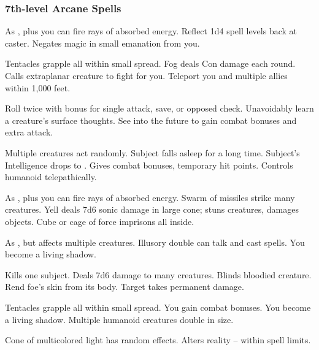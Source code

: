 \subsubsection{7th-level Arcane Spells}
\begin{swspelllist}
     As , plus you can fire rays of absorbed energy.
     Reflect 1d4 spell levels back at caster.
     Negates magic in small emanation from you.

     Tentacles grapple all within small spread.
     Fog deals Con damage each round.
     Calls extraplanar creature to fight for you.
     Teleport you and multiple allies within 1,000 feet.

     Roll twice with bonus for single attack, save, or opposed check.
     Unavoidably learn a creature's surface thoughts.
     See into the future to gain combat bonuses and extra attack.

     Multiple creatures act randomly.
     Subject falls asleep for a long time.
     Subject's Intelligence drops to .
     Gives combat bonuses, temporary hit points.
     Controls humanoid telepathically.

     As , plus you can fire rays of absorbed energy.
     Swarm of missiles strike many creatures.
     Yell deals 7d6 sonic damage in large cone; stuns creatures, damages objects.
    \M Cube or cage of force imprisons all inside.

     As , but affects multiple creatures.
     Illusory double can talk and cast spells.
     You become a living shadow.
    \spellheadrestricted{}

     Kills one subject.
     Deals 7d6 damage to many creatures.
     Blinds bloodied creature.
     Rend foe's skin from its body.
     Target takes permanent damage.

     Tentacles grapple all within small spread.
    \M You gain combat bonuses.
     You become a living shadow.
     Multiple humanoid creatures double in size.

     Cone of multicolored light has random effects.
    \M Alters reality -- within spell limits.
\end{swspelllist}

